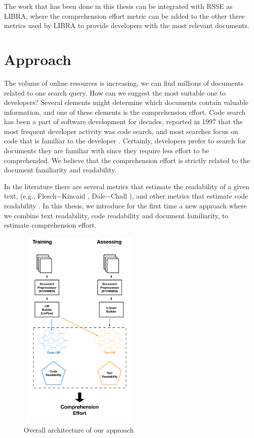 \documentclass[12pt,mscthesis]{usiinfthesis}
\begin{document}
	The work that has been done in this thesis can be integrated with RSSE as LIBRA, where the comprehension effort metric can be added to the other three metrics used by LIBRA to provide developers with the most relevant documents.


\chapter{Approach}
	The volume of online resources is increasing, we can find millions of documents related to one search query. How can we suggest the most suitable one to developers? Several elements might determine which documents contain valuable information, and one of these elements is the comprehension effort. Code search has been a part of software development for decades, \citet{Singer-1997} reported in 1997 that the most frequent developer activity was code search, and most searches focus on code that is familiar to the developer \cite{Sadowski:2015}. Certainly, developers prefer to search for documents they are familiar with since they require less effort to be comprehended. We believe that the comprehension effort is strictly related to the document familiarity and readability.
     
    In the literature there are several metrics that estimate the readability of a given text, (e.g., Flesch$-$Kincaid \cite{Kincaid}, Dale$-$Chall \cite{Dale-Chall}), and other metrics that estimate code readability \cite{Buse:2010:LMC:1850489.1850615}. In this thesis, we introduce for the first time a new approach where we combine text readability, code readability and document familiarity, to estimate comprehension effort.\\

	
	
	\begin{figure}[H]
	\centering
	\includegraphics[width=6cm, height=10cm]{overview}
	\caption{Overall architecture of our approach}
	\label{overview}
	\end{figure}
	
\end{document}
